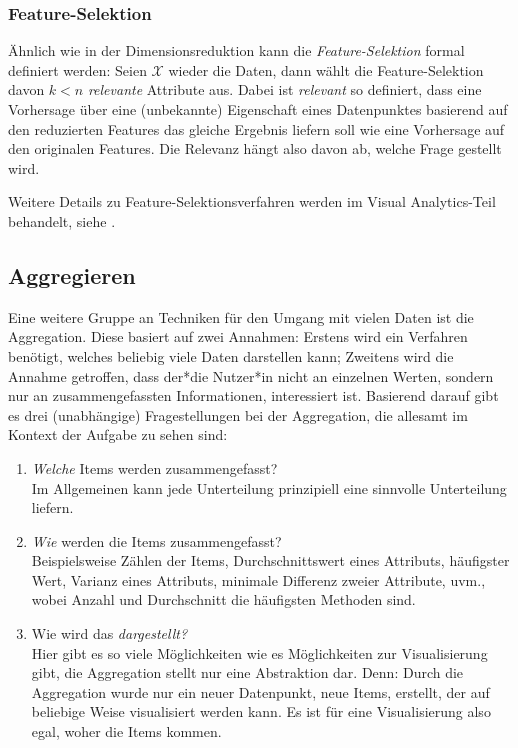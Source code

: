 		\subsubsection{Feature-Selektion}
			Ähnlich wie in der Dimensionsreduktion kann die \emph{Feature-Selektion} formal definiert werden: Seien \(\mathcal{X}\) wieder die Daten, dann wählt die Feature-Selektion davon \( k < n \) \emph{relevante} Attribute aus. Dabei ist \emph{relevant} so definiert, dass eine Vorhersage über eine (unbekannte) Eigenschaft eines Datenpunktes basierend auf den reduzierten Features das gleiche Ergebnis liefern soll wie eine Vorhersage auf den originalen Features. Die Relevanz hängt also davon ab, welche Frage gestellt wird.

			Weitere Details zu Feature-Selektionsverfahren werden im Visual Analytics-Teil behandelt, siehe .

	\subsection{Aggregieren}
		Eine weitere Gruppe an Techniken für den Umgang mit vielen Daten ist die Aggregation. Diese basiert auf zwei Annahmen: Erstens wird ein Verfahren benötigt, welches beliebig viele Daten darstellen kann; Zweitens wird die Annahme getroffen, dass der*die Nutzer*in nicht an einzelnen Werten, sondern nur an zusammengefassten Informationen, interessiert ist. Basierend darauf gibt es drei (unabhängige) Fragestellungen bei der Aggregation, die allesamt im Kontext der Aufgabe zu sehen sind:
		\begin{enumerate}
			\item \emph{Welche} Items werden zusammengefasst? \\
				Im Allgemeinen kann jede Unterteilung prinzipiell eine sinnvolle Unterteilung liefern.
			\item \emph{Wie} werden die Items zusammengefasst? \\
				Beispielsweise Zählen der Items, Durchschnittswert eines Attributs, häufigster Wert, Varianz eines Attributs, minimale Differenz zweier Attribute, uvm., wobei Anzahl und Durchschnitt die häufigsten Methoden sind.
			\item Wie wird das \emph{dargestellt?} \\
				Hier gibt es so viele Möglichkeiten wie es Möglichkeiten zur Visualisierung gibt, die Aggregation stellt nur eine Abstraktion dar. Denn: Durch die Aggregation wurde nur ein neuer Datenpunkt, \bzw neue Items, erstellt, der auf beliebige Weise visualisiert werden kann. Es ist für eine Visualisierung also egal, woher die Items kommen.
		\end{enumerate}

